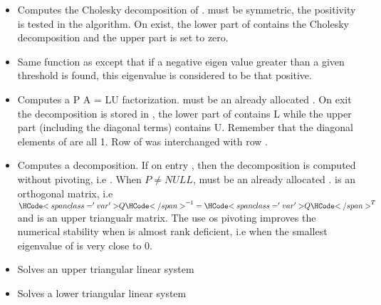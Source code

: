 \begin{itemize}
\item {}
  \sshortdescribe Computes the Cholesky decomposition of .  must
  be symmetric, the positivity is tested in the algorithm. On exist, the lower
  part of  contains the Cholesky decomposition and the upper part is
  set to zero.

\item {}
  \sshortdescribe Same function as  except that if a negative
  eigen value greater than a given threshold is found, this eigenvalue is
  considered to be that positive.

\item {} 
  \sshortdescribe Computes a P A = LU factorization.  must be an
  already allocated  . On exit the decomposition is
  stored in , the lower part of  contains L while the upper part
  (including the diagonal terms) contains U. Remember that the diagonal
  elements of  are all 1. Row  of  was interchanged with
  row .
  
\item {} 
  \sshortdescribe Computes a  decomposition. If on entry
  , then the decomposition is computed without pivoting, i.e
  . When $P \ne NULL$,  must be an already allocated
  .  is an orthogonal matrix, i.e
  $\var{Q}^{-1} = \var{Q}^{T}$ and  is an upper triangualr matrix. The
  use os pivoting improves the numerical stability when  is almost rank
  deficient, i.e when the smallest eigenvalue of  is very close to $0$.

\item {}
  \sshortdescribe Solves an upper triangular linear system 

\item {}
  \sshortdescribe Solves a lower triangular linear system  
  

\end{itemize}
